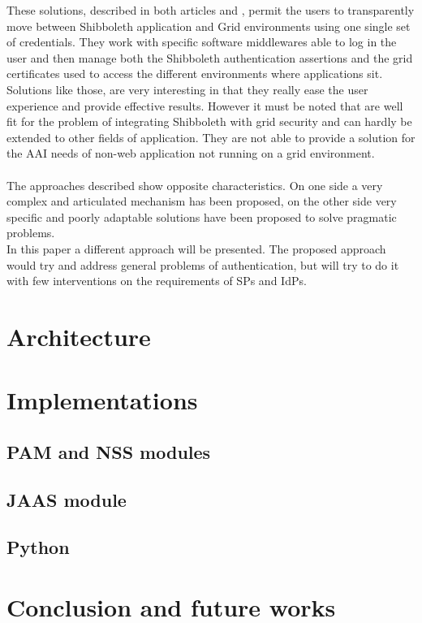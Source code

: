 These solutions, described in both articles \cite{Wang-2009} and \cite{Jensen-2007}, permit the users to transparently move between Shibboleth application and Grid
environments using one single set of credentials.
They work with specific software middlewares able to log in the user and then manage both the Shibboleth authentication assertions and the grid certificates used to access
the different environments where applications sit.\\
Solutions like those, are very interesting in that they really ease the user experience and provide effective results.
However it must be noted that are well fit for the problem of integrating Shibboleth with grid security and can hardly be extended to other fields of application.
They are not able to provide a solution for the AAI needs of non-web application not running on a grid environment.\\
\\
The approaches described show opposite characteristics.
On one side a very complex and articulated mechanism has been proposed, on the other side very specific and poorly adaptable solutions have been proposed to solve pragmatic
problems.\\
In this paper a different approach will be presented.
The proposed approach would try and address general problems of authentication, but will try to do it with few interventions on the requirements of SPs and IdPs.

\label{sec:architecture}
\section{Architecture}

\label{sec:implementations}
\section{Implementations}

\label{sec:pamnss}
\subsection{PAM and NSS modules}

\label{sec:jaas}
\subsection{JAAS module}

\label{sec:python}
\subsection{Python}

\label{sec:conclusion}
\section{Conclusion and future works}

